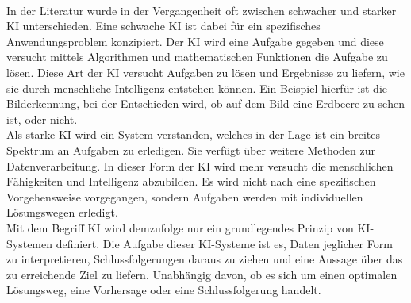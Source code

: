 \begin{onehalfspace}
        \\
        In der Literatur wurde in der Vergangenheit oft zwischen \glqq{}schwacher\grqq{} und \glqq{}starker\grqq{} \ac{KI} unterschieden. Eine schwache \ac{KI} ist dabei für ein spezifisches Anwendungsproblem konzipiert. Der \ac{KI} wird eine Aufgabe gegeben und diese versucht mittels Algorithmen und mathematischen Funktionen die Aufgabe zu lösen. Diese Art der \ac{KI} versucht Aufgaben zu lösen und Ergebnisse zu liefern, wie sie durch menschliche Intelligenz entstehen können.\cite{Lis2019} Ein Beispiel hierfür ist die Bilderkennung, bei der Entschieden wird, ob auf dem Bild eine Erdbeere zu sehen ist, oder nicht.
        \\
        Als starke \ac{KI} wird ein System verstanden, welches in der Lage ist ein breites Spektrum an Aufgaben zu erledigen.\cite{Datenkommission2019} Sie verfügt über weitere Methoden zur Datenverarbeitung. In dieser Form der \ac{KI} wird mehr versucht die menschlichen Fähigkeiten und Intelligenz abzubilden. Es wird nicht nach eine spezifischen Vorgehensweise vorgegangen, sondern Aufgaben werden mit individuellen Lösungswegen erledigt.\cite{Lis2019}
        \\
        Mit dem Begriff \ac{KI} wird demzufolge nur ein grundlegendes Prinzip von \ac*{KI}-Systemen definiert. Die Aufgabe dieser \ac*{KI}-Systeme ist es, Daten jeglicher Form zu interpretieren, Schlussfolgerungen daraus zu ziehen und eine Aussage über das zu erreichende Ziel zu liefern. Unabhängig davon, ob es sich um einen optimalen Lösungsweg, eine Vorhersage oder eine Schlussfolgerung handelt.\cite{HEGKI2019Definition}    
    

\end{onehalfspace}

